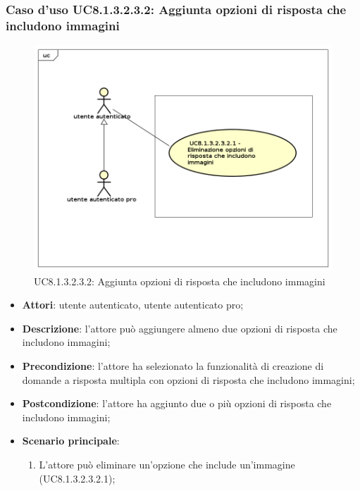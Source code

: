 \subsubsection{Caso d'uso UC8.1.3.2.3.2: Aggiunta opzioni di risposta che includono immagini}
	\label{UC8.1.3.2.3.2}
	\begin{figure}[h]
		\centering
			\includegraphics[scale=0.45,keepaspectratio]{UML/UC8_1_3_2_3_2.png}
		\caption{UC8.1.3.2.3.2:  Aggiunta opzioni di risposta che includono immagini}
	\end{figure}	
	\FloatBarrier
	\begin{itemize}
		\item
			\textbf{Attori}: utente autenticato, utente autenticato pro;
		\item		
			\textbf{Descrizione}: l'attore può aggiungere almeno due opzioni di risposta che includono immagini;
		\item
			\textbf{Precondizione}: l'attore ha selezionato la funzionalità di creazione di domande a risposta multipla con opzioni di risposta che includono immagini; 
		\item
			\textbf{Postcondizione}: l'attore ha aggiunto due o più opzioni di risposta che includono immagini;
		\item
			\textbf{Scenario principale}: 
				\begin{enumerate}
					\item
						L'attore può eliminare un'opzione che include un'immagine (UC8.1.3.2.3.2.1); 				
				\end{enumerate}
	\end{itemize}
	
